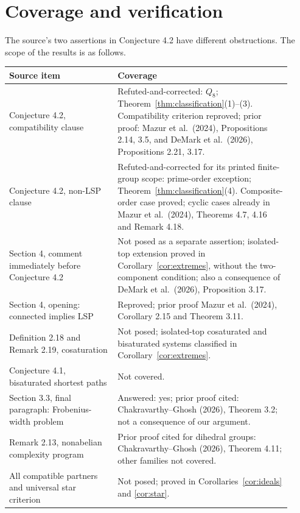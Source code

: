 \documentclass[11pt]{article}
\begin{document}
\section{Coverage and verification}
The source's two assertions in Conjecture 4.2 have different obstructions.
The scope of the results is as follows.
\begin{center}\small
\begin{tabular}{>{\raggedright\arraybackslash}p{0.35\linewidth}>{\raggedright\arraybackslash}p{0.57\linewidth}}
\toprule
Source item & Coverage\\
\midrule
Conjecture 4.2, compatibility clause & Refuted-and-corrected: $Q_8$;
Theorem~\ref{thm:classification}(1)--(3). Compatibility criterion reproved;
prior proof: Mazur et al.\ (2024), Propositions 2.14, 3.5, and
DeMark et al.\ (2026), Propositions 2.21, 3.17.\\
Conjecture 4.2, non-LSP clause & Refuted-and-corrected for its printed
finite-group scope: prime-order exception; Theorem~\ref{thm:classification}(4).
Composite-order case proved; cyclic cases already in
Mazur et al.\ (2024), Theorems 4.7, 4.16 and Remark 4.18.\\
Section 4, comment immediately before Conjecture 4.2 & Not posed as a
separate assertion; isolated-top extension proved in
Corollary~\ref{cor:extremes}, without the two-component condition;
also a consequence of DeMark et al.\ (2026), Proposition 3.17.\\
Section 4, opening: connected implies LSP & Reproved; prior proof
Mazur et al.\ (2024), Corollary 2.15 and Theorem 3.11.\\
Definition 2.18 and Remark 2.19, cosaturation & Not posed; isolated-top
cosaturated and bisaturated systems classified in
Corollary~\ref{cor:extremes}.\\
Conjecture 4.1, bisaturated shortest paths & Not covered.\\
Section 3.3, final paragraph: Frobenius-width problem & Answered: yes;
prior proof cited:
Chakravarthy--Ghosh (2026), Theorem 3.2; not a consequence of our argument.\\
Remark 2.13, nonabelian complexity program & Prior proof cited for dihedral
groups: Chakravarthy--Ghosh (2026), Theorem 4.11; other families not covered.\\
All compatible partners and universal star criterion & Not posed;
proved in Corollaries~\ref{cor:ideals} and \ref{cor:star}.\\
\bottomrule
\end{tabular}
\end{center}
\end{document}
